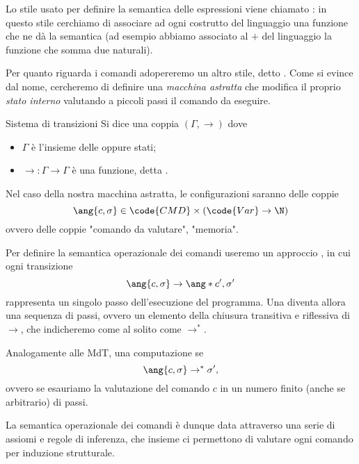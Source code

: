 Lo stile usato per definire la semantica delle espressioni viene chiamato : in questo stile cerchiamo di associare ad ogni costrutto del linguaggio una funzione che ne dà la semantica (ad esempio abbiamo associato al $+$ del linguaggio la funzione che somma due naturali).

Per quanto riguarda i comandi adopereremo un altro stile, detto . Come si evince dal nome, cercheremo di definire una \emph{macchina astratta} che modifica il proprio \emph{stato interno} valutando a piccoli passi il comando da eseguire.

\begin{definition}
    {Sistema di transizioni}{}
    Si dice  una coppia $(\Gamma, \to)$ dove \begin{itemize}
        \item $\Gamma$ è l'insieme delle  oppure stati;
        \item $\to : \Gamma \to \Gamma$ è una funzione, detta . 
    \end{itemize} 
\end{definition}

Nel caso della nostra macchina astratta, le configurazioni saranno delle coppie \[
    \ang{c, \sigma} \in \code{CMD} \times (\code{Var} \to \N)
\] ovvero delle coppie "comando da valutare", "memoria".

Per definire la semantica operazionale dei comandi useremo un approccio , in cui ogni transizione \[
    \ang{c, \sigma} \to \ang*{c', \sigma'}
\] rappresenta un singolo passo dell'esecuzione del programma. Una  diventa allora una sequenza di passi, ovvero un elemento della chiusura transitiva e riflessiva di $\to$, che indicheremo come al solito come $\to^\ast$.

Analogamente alle MdT, una computazione  se \[
    \ang{c, \sigma} \to^\ast \sigma',
\] ovvero se esauriamo la valutazione del comando $c$ in un numero finito (anche se arbitrario) di passi.

La semantica operazionale dei comandi è dunque data attraverso una serie di assiomi e regole di inferenza, che insieme ci permettono di valutare ogni comando per induzione strutturale.

